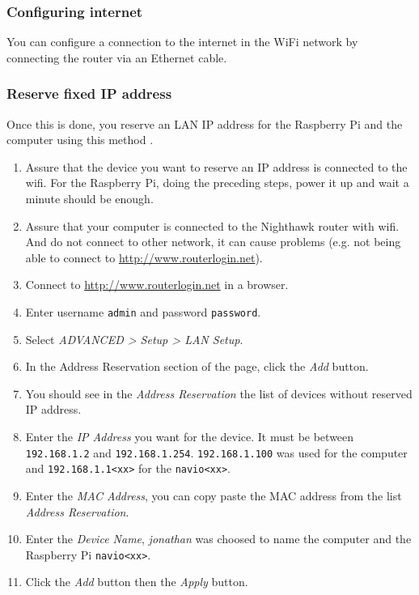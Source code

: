 \subsubsection{Configuring internet}
You can configure a connection to the internet in the WiFi network by connecting the router via an Ethernet cable.

\subsubsection{Reserve fixed IP address}
Once this is done, you reserve an LAN IP address for the Raspberry Pi and the computer using this method \cite{netgear_reserve_ip}.
\begin{enumerate}
    \item Assure that the device you want to reserve an IP address is connected to the wifi. For the Raspberry Pi, doing the preceding steps, power it up and wait a minute should be enough.
    \item Assure that your computer is connected to the Nighthawk router with wifi. And do not connect to other network, it can cause problems (e.g. not being able to connect to \url{http://www.routerlogin.net}).
    \item Connect to \url{http://www.routerlogin.net} in a browser.
    \item Enter username \texttt{admin} and password \texttt{password}.
    \item Select \emph{ADVANCED > Setup > LAN Setup}.
    \item In the Address Reservation section of the page, click the \emph{Add} button.
    \item You should see in the \emph{Address Reservation} the list of devices without reserved IP address.
    \item Enter the \emph{IP Address} you want for the device. It must be between \texttt{192.168.1.2} and \texttt{192.168.1.254}. \texttt{192.168.1.100} was used for the computer and \texttt{192.168.1.1<xx>} for the \texttt{navio<xx>}.
    \item Enter the \emph{MAC Address}, you can copy paste the MAC address from the list \emph{Address Reservation}.
    \item Enter the \emph{Device Name}, \emph{jonathan} was choosed to name the computer and the Raspberry Pi \texttt{navio<xx>}.
    \item Click the \emph{Add} button then the \emph{Apply} button.
\end{enumerate}

